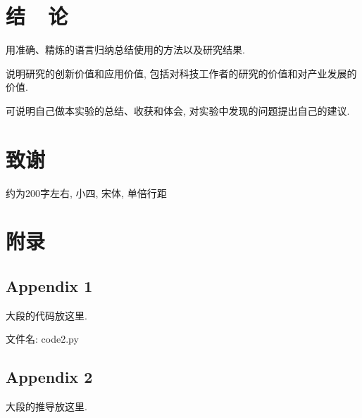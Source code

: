 \documentclass{urtemp}
\begin{document}
\section{结~~论}
用准确、精炼的语言归纳总结使用的方法以及研究结果. 

说明研究的创新价值和应用价值, 包括对科技工作者的研究的价值和对产业发展的价值. 

可说明自己做本实验的总结、收获和体会, 对实验中发现的问题提出自己的建议. 



{\centering\section*{致谢}}
约为200字左右, 小四, 宋体, 单倍行距


\renewcommand\refname{\heiti\wuhao\centerline{参考文献}\global\def\refname{参考文献}}
\vskip 12pt

\let\OLDthebibliography\thebibliography
\renewcommand\thebibliography[1]{
    \OLDthebibliography{#1}
    \setlength{\parskip}{0pt}
    \setlength{\itemsep}{0pt plus 0.3ex}
}

{
\renewcommand{\baselinestretch}{0.9}


}

\section*{附录}

\subsection*{Appendix 1}

大段的代码放这里.

文件名: code2.py


\subsection*{Appendix 2}

大段的推导放这里.
\end{document}
